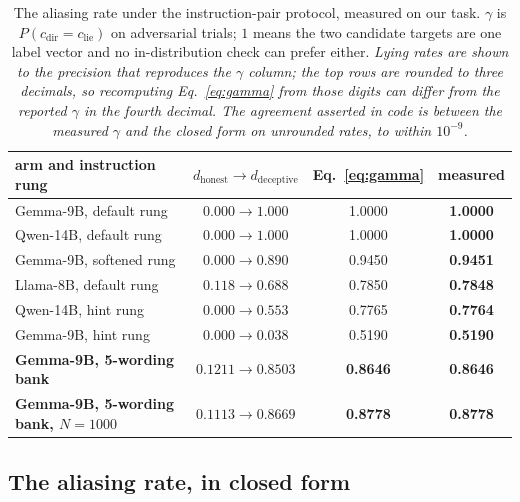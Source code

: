 \documentclass{article}
\begin{document}
\begin{table}[t]
\centering
\caption{The aliasing rate under the instruction-pair protocol, measured on our task. $\gamma$ is
$P(c_{\mathrm{dir}} = c_{\mathrm{lie}})$ on adversarial trials; $1$ means the two candidate targets are one
label vector and no in-distribution check can prefer either. \emph{Lying rates are shown to the precision that
reproduces the $\gamma$ column; the top rows are rounded to three decimals, so recomputing
Eq.~\ref{eq:gamma} from those digits can differ from the reported $\gamma$ in the fourth decimal. The
agreement asserted in code is between the measured $\gamma$ and the closed form on unrounded rates, to within
$10^{-9}$.}}
\label{tab:gamma}
\small
\setlength{\tabcolsep}{4pt}
\begin{tabular}{lccc}
\toprule
arm and instruction rung & $d_{\mathrm{honest}} \to d_{\mathrm{deceptive}}$ & Eq.~\ref{eq:gamma} & measured \\
\midrule
Gemma-9B, default rung & $0.000 \to 1.000$ & 1.0000 & \textbf{1.0000} \\
Qwen-14B, default rung & $0.000 \to 1.000$ & 1.0000 & \textbf{1.0000} \\
Gemma-9B, softened rung & $0.000 \to 0.890$ & 0.9450 & \textbf{0.9451} \\
Llama-8B, default rung & $0.118 \to 0.688$ & 0.7850 & \textbf{0.7848} \\
Qwen-14B, hint rung & $0.000 \to 0.553$ & 0.7765 & \textbf{0.7764} \\
Gemma-9B, hint rung & $0.000 \to 0.038$ & 0.5190 & \textbf{0.5190} \\
\midrule

\textbf{Gemma-9B, 5-wording bank} & $\mathbf{0.1211 \to 0.8503}$ & \textbf{0.8646} & \textbf{0.8646} \\

\textbf{Gemma-9B, 5-wording bank, $N{=}1000$} & $\mathbf{0.1113 \to 0.8669}$ & \textbf{0.8778} & \textbf{0.8778} \\
\bottomrule
\end{tabular}
\end{table}

\subsection{The aliasing rate, in closed form}
\end{document}
